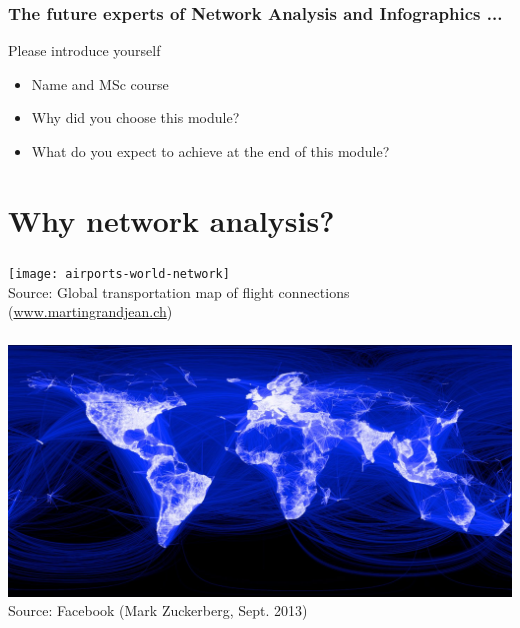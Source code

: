 \documentclass[8pt]{beamer}
\begin{document}

\begin{frame}
\frametitle{The future experts of Network Analysis and Infographics ...}

Please introduce yourself

\begin{itemize}
	\item Name and MSc course
	\item Why did you choose this module?
	\item What do you expect to achieve at the end of this module?
\end{itemize}

\end{frame}




	
\section{Why network analysis?}


\bgroup
{}
\begin{frame}[plain]{}
\begin{center}
\color{white}{\Huge \insertsection}
\end{center}
\end{frame}
\egroup


\begin{frame}
\frametitle{\insertsection}
\centering
\texttt{[image: airports-world-network]}\\
\tiny Source: Global transportation map of flight connections (\url{www.martingrandjean.ch})
\end{frame}


\begin{frame}
\frametitle{\insertsection}
\centering
\includegraphics[width=\linewidth,height=\textheight,keepaspectratio]{facebook}\\
\tiny Source: Facebook (Mark Zuckerberg, Sept. 2013)
\end{frame}
\end{document}
